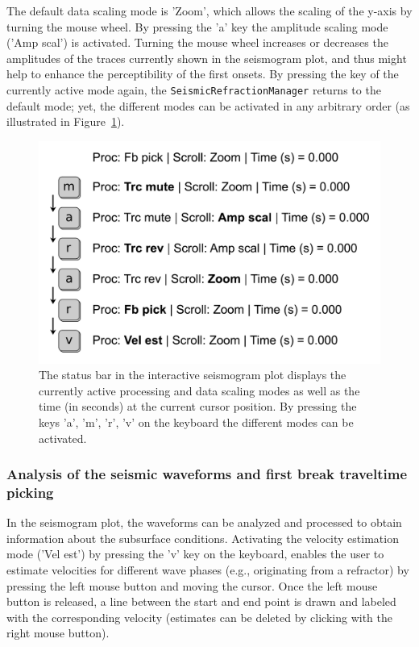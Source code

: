 \documentclass[a4paper,fleqn]{cas-sc}
\begin{document}
The default data scaling mode is 'Zoom', which allows the scaling of the y-axis by turning the mouse wheel. By pressing the 'a' key the amplitude scaling mode ('Amp scal') is activated. Turning the mouse wheel increases or decreases the amplitudes of the traces currently shown in the seismogram plot, and thus might help to enhance the perceptibility of the first onsets.
By pressing the key of the currently active mode again, the \texttt{SeismicRefractionManager} returns to the default mode; yet, the different modes can be activated in any arbitrary order (as illustrated in Figure~\ref{fig:statusbar_intro}).
\begin{figure}
	\centering
	\includegraphics[width=.75\textwidth]{figures/status_bar.pdf}
	\caption{The status bar in the interactive seismogram plot displays the currently active processing and data scaling modes as well as the time (in seconds) at the current cursor position. By pressing the keys 'a', 'm', 'r', 'v' on the keyboard the different modes can be activated.}
	\label{fig:statusbar_intro}
\end{figure}

\subsubsection{Analysis of the seismic waveforms and first break traveltime picking}

In the seismogram plot, the waveforms can be analyzed and processed to obtain information about the subsurface conditions. Activating the velocity estimation mode ('Vel est') by pressing the 'v' key on the keyboard, enables the user to estimate velocities for different wave phases (e.g., originating from a refractor) by pressing the left mouse button and moving the cursor. Once the left mouse button is released, a line between the start and end point is drawn and labeled with the corresponding velocity (estimates can be deleted by clicking with the right mouse button).
\end{document}
